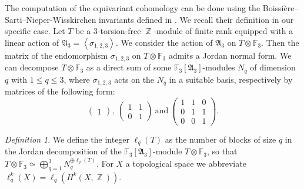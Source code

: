 \documentclass[a4paper]{article}
\theoremstyle{remark}
\newtheorem{defi}{Definition}
\DeclareMathOperator{\Z}{\mathbb{Z}}
\DeclareMathOperator{\F}{\mathbb{F}_{p}}
\begin{document}
The computation of the equivariant cohomology can be done using the Boissi\`ere--Sarti--Nieper-Wisskirchen invariants defined in \cite[Section 2]{SmithTh}. 
We recall their definition in our specific case. Let $T$ be a $3$-torsion-free $\Z$-module of finite rank equipped with a linear action of $\mathfrak{A}_3=\left\langle \sigma_{1,2,3}\right\rangle$. 
We consider the action of $\mathfrak{A}_3$ on $T\otimes\mathbb{F}_3$. Then the matrix of the endomorphism $\sigma_{1,2,3}$ on $T\otimes\mathbb{F}_3$ admits a Jordan normal form.  
We can decompose $T\otimes\mathbb{F}_3$ as a direct sum of some $\mathbb{F}_3[\mathfrak{A}_3]$-modules $N_{q}$ of dimension $q$ with $1\leq q\leq 3$, where $\sigma_{1,2,3}$ acts on the $N_{q}$ in a suitable basis, respectively by matrices of the following form:
$$\begin{pmatrix}
1\end{pmatrix},\ 
\begin{pmatrix}
1 & 1\\
0 & 1
\end{pmatrix}\
\text{and}\
\begin{pmatrix}
1 & 1 & 0\\
0 & 1 & 1\\
0 & 0 & 1
\end{pmatrix}.
$$
\begin{defi}
We define the integer $\ell_{q}(T)$ as the number of blocks of size $q$ in the Jordan decomposition of the $\mathbb{F}_3[\mathfrak{A}_3]$-module $T\otimes\mathbb{F}_3$, so that $T\otimes\mathbb{F}_3\simeq \bigoplus_{q=1}^{3} N_{q}^{\oplus \ell_{q}(T)}$.
For $X$ a topological space we abbreviate
$ \ell_q^k(X)=\ell_q(H^k(X,\Z))$.
\end{defi}
\end{document}

